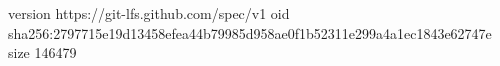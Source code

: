 version https://git-lfs.github.com/spec/v1
oid sha256:2797715e19d13458efea44b79985d958ae0f1b52311e299a4a1ec1843e62747e
size 146479
